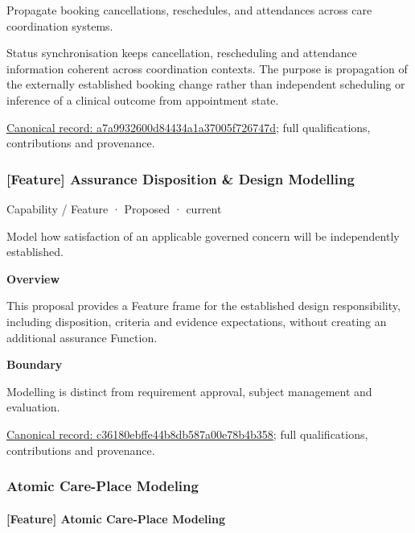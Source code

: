 Propagate booking cancellations, reschedules, and attendances across care coordination systems.



Status synchronisation keeps cancellation, rescheduling and attendance information coherent across coordination contexts. The purpose is propagation of the externally established booking change rather than independent scheduling or inference of a clinical outcome from appointment state.


{\footnotesize \href{../../../../continuum/strategy/capability/feature/a7a9932600d84434a1a37005f726747d.md}{Canonical record: a7a9932600d84434a1a37005f726747d}; full qualifications, contributions and provenance.}\par
\subsubsection{[Feature] Assurance Disposition \& Design Modelling}

\label{element:c36180ebffe44b8db587a00e78b4b358}
{\small Capability / Feature · Proposed · current}\par

Model how satisfaction of an applicable governed concern will be independently established.



\textbf{Overview}



This proposal provides a Feature frame for the established design responsibility, including disposition, criteria and evidence expectations, without creating an additional assurance Function.



\textbf{Boundary}



Modelling is distinct from requirement approval, subject management and evaluation.


{\footnotesize \href{../../../../continuum/strategy/capability/feature/c36180ebffe44b8db587a00e78b4b358.md}{Canonical record: c36180ebffe44b8db587a00e78b4b358}; full qualifications, contributions and provenance.}\par
\subsubsection{Atomic Care-Place Modeling}

\paragraph{[Feature] Atomic Care-Place Modeling}

